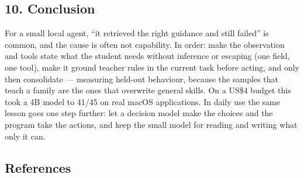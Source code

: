 \documentclass[
  10pt,
]{article}
\begin{document}
\subsection{10. Conclusion}\label{conclusion}

For a small local agent, ``it retrieved the right guidance and still
failed'' is common, and the cause is often not capability. In order:
make the observation and tools state what the student needs without
inference or escaping (one field, one tool), make it ground teacher
rules in the current task before acting, and only then consolidate ---
measuring held-out behaviour, because the samples that teach a family
are the ones that overwrite general skills. On a US\$4 budget this took
a 4B model to 41/45 on real macOS applications. In daily use the same
lesson goes one step further: let a decision model make the choices and
the program take the actions, and keep the small model for reading and
writing what only it can.

\subsection{References}\label{references}
\end{document}
